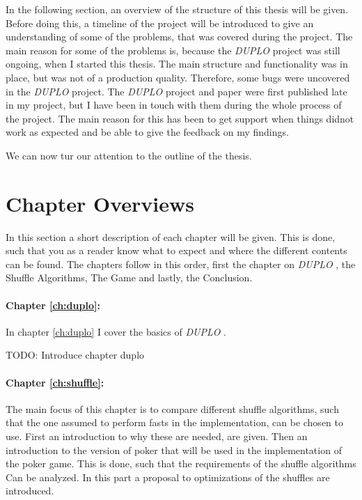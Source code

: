 \documentclass[twoside,11pt,openright]{report}
\newcommand{\todo}[1]{}
\renewcommand{\todo}[1]{{\color{red} TODO: {#1}} \\}
\newcommand{\DUPLO}{\textit{DUPLO} }
\begin{document}
\bigskip

In the following section, an overview of the structure of this thesis will be given. Before doing this, a timeline of the project will be introduced to give an understanding of some of the problems, that was covered during the project. The main reason for some of the problems is, because the \DUPLO project was still ongoing, when I started this thesis. The main structure and functionality was in place, but was not of a production quality. Therefore, some bugs were uncovered in the \DUPLO project. The \DUPLO project and paper were first published late in my project, but I have been in touch with them during the whole process of the project. The main reason for this has been to get support when things didnot work as expected and be able to give the feedback on my findings.

We can now tur our attention to the outline of the thesis.


\section{Chapter Overviews}
\label{ch:overview}
In this section a short description of each chapter will be given. This is done, such that you as a reader know what to expect and where the different contents can be found. The chapters follow in this order, first the chapter on \DUPLO, the Shuffle Algorithms, The Game and lastly, the Conclusion.

\paragraph{Chapter \ref{ch:duplo}:}
In chapter \ref{ch:duplo} I cover the basics of \DUPLO. 

\todo{Introduce chapter duplo}

\paragraph{Chapter \ref{ch:shuffle}:}
The main focus of this chapter is to compare different shuffle algorithms, such that the one assumed to perform fasts in the implementation, can be chosen to use. First an introduction to why these are needed, are given. Then an introduction to the version of poker that will be used in the implementation of the poker game. This is done, such that the requirements of the shuffle algorithms Can be analyzed. In this part a proposal to optimizations of the shuffles are introduced. 
\end{document}
